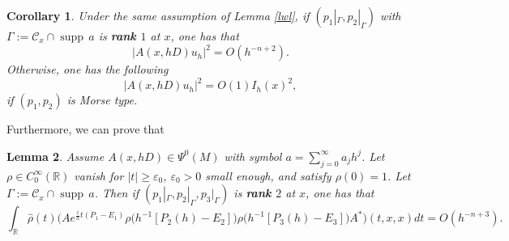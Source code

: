 \documentclass[12pt,reqno]{amsart}
\renewcommand{\epsilon}{\varepsilon}
\newcommand{\supp}{{\operatorname{supp\,}}}
\newtheorem{cor}{{\sc Corollary}}[section]
\newtheorem{lem}[cor]{{\sc Lemma}}
\numberwithin{equation}{section}
\begin{document}
\begin{cor}\label{cor}
Under the same assumption of Lemma \ref{lwl}, if $(p_1|_{\Gamma}, p_2|_{\Gamma})$ with $\Gamma:=\mathcal{C}_x\cap \supp a$ is {\bf rank $1$} at $x$, one has that 
\begin{equation}\label{main cor eq2}
|A(x,hD) u_{h}|^2=O(h^{-n+2}).
\end{equation}
Otherwise, one has the following
\begin{equation}
|A(x,hD) u_{h}|^2=O(1) I_h(x)^2,
\end{equation}
if $(p_1, p_2)$ is Morse type.
\end{cor}

Furthermore, we can prove that
\begin{lem}\label{lwl 2}
Assume $A(x, hD)\in \Psi^0(M)$ with symbol $a=\sum_{j=0}^\infty a_j h^j$. Let $\rho\in C_0^\infty(\mathbb{R})$ vanish for $|t|\geq \epsilon_0$, $\epsilon_0>0$ small enough, and satisfy $\rho(0)=1$. Let $\Gamma:=\mathcal{C}_x\cap \supp a$. Then if $(p_1|_\Gamma, p_2|_\Gamma, p_3|_\Gamma)$ is {\bf rank $2$} at $x$, one has that
\begin{equation}\label{main lemma 2 eq}
\int_{\mathbb{R}} \hat{\rho}(t) \big(A e^{\frac{i}h t(P_1-E_1)}  \rho\big(h^{-1}[P_2(h)-E_2]\big)\rho\big(h^{-1}[P_3(h)-E_3]\big)  A^*\big)(t,x,x) dt =O(h^{-n+3}).
\end{equation}
\end{lem}
\end{document}

